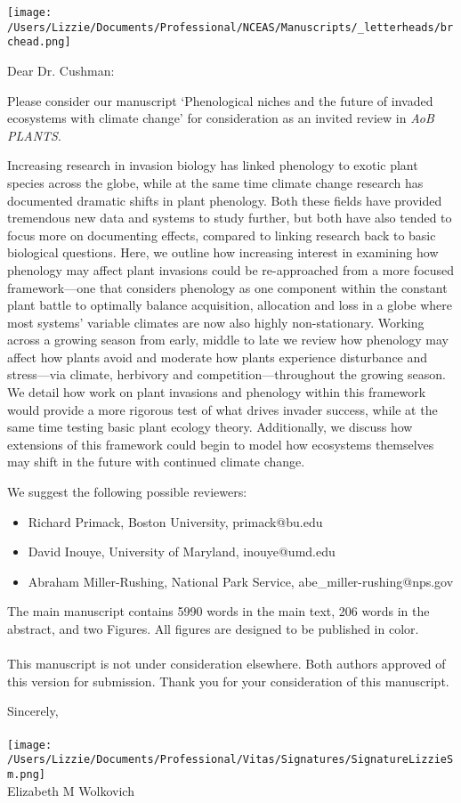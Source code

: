 \documentclass[11pt,a4paper]{letter}
\begin{document}
\begin{letter}{}
\texttt{[image: /Users/Lizzie/Documents/Professional/NCEAS/Manuscripts/\_letterheads/brchead.png]}
\opening{Dear Dr. Cushman:}

Please consider our manuscript `Phenological niches and the future of invaded ecosystems with climate change' for consideration as an invited review in \emph{AoB PLANTS}.

Increasing research in invasion biology has linked phenology to exotic plant species across the globe, while at the same time climate change research has documented dramatic shifts in plant phenology. Both these fields have provided tremendous new data and systems to study further, but both have also tended to focus more on documenting effects, compared to linking research back to basic biological questions. Here, we outline how increasing interest in examining how phenology may affect plant invasions could be re-approached from a more focused framework---one that considers phenology as one component within the constant plant battle to optimally balance acquisition, allocation and loss in a globe where most systems' variable climates are now also highly non-stationary. Working across a growing season from early, middle to late we review how phenology may affect how plants avoid and moderate how plants experience disturbance and stress---via climate, herbivory and competition---throughout the growing season. We detail how work on plant invasions and phenology within this framework would provide a more rigorous test of what drives invader success, while at the same time testing basic plant ecology theory. Additionally, we discuss how extensions of this framework could begin to model how ecosystems themselves may shift in the future with continued climate change. 

We suggest the following possible reviewers:
\begin{itemize}
\item Richard Primack, Boston University, primack@bu.edu
\item David Inouye, University of Maryland, inouye@umd.edu
\item Abraham Miller-Rushing, National Park Service, abe\_miller-rushing@nps.gov
\end{itemize}

The main manuscript contains 5990 words in the main text, 206 words in the abstract, and two Figures. All figures are designed to be published in color. \\
\\
This manuscript is not under consideration elsewhere. Both authors approved of this version for submission. Thank you for your consideration of this manuscript.

\noindent Sincerely,  \\
\\
 \texttt{[image: /Users/Lizzie/Documents/Professional/Vitas/Signatures/SignatureLizzieSm.png]} 
\\
\noindent Elizabeth M Wolkovich
\end{letter}
\end{document}

